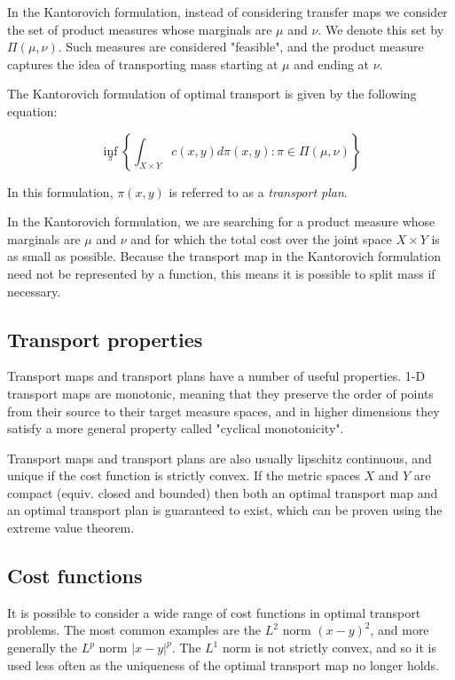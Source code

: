 In the Kantorovich formulation, instead of considering transfer maps we consider the set of product measures whose marginals are $\mu$ and $\nu$. We denote this set by $\Pi(\mu, \nu)$. Such measures are considered "feasible", and the product measure captures the idea of transporting mass starting at $\mu$ and ending at $\nu$.

\begin{definition}

The Kantorovich formulation of optimal transport is given by the following equation:

$$\inf_{\pi} \left\{ \int_{X \times Y} c(x, y) d \pi(x, y) : \pi \in \Pi(\mu, \nu) \right\}$$

In this formulation, $\pi(x,y)$ is referred to as a \textit{transport plan}.

\end{definition}

In the Kantorovich formulation, we are searching for a product measure whose marginals are $\mu$ and $\nu$ and for which the total cost over the joint space $X \times Y$ is as small as possible. Because the transport map in the Kantorovich formulation need not be represented by a function, this means it is possible to split mass if necessary.

\subsection{Transport properties}

Transport maps and transport plans have a number of useful properties. 1-D transport maps are monotonic, meaning that they preserve the order of points from their source to their target measure spaces, and in higher dimensions they satisfy a more general property called "cyclical monotonicity".

Transport maps and transport plans are also usually lipschitz continuous, and unique if the cost function is strictly convex. If the metric spaces $X$ and $Y$ are compact (equiv. closed and bounded) then both an optimal transport map and an optimal transport plan is guaranteed to exist, which can be proven using the extreme value theorem.

\subsection{Cost functions}

It is possible to consider a wide range of cost functions in optimal transport problems. The most common examples are the $L^2$ norm $(x - y)^2$, and more generally the $L^p$ norm $|x-y|^p$. The $L^1$ norm is not strictly convex, and so it is used less often as the uniqueness of the optimal transport map no longer holds.

